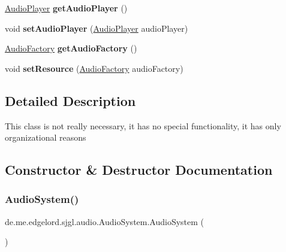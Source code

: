 \begin{DoxyCompactItemize}
\mbox{\hyperlink{classde_1_1me_1_1edgelord_1_1sjgl_1_1audio_1_1_audio_player}{Audio\+Player}} {\bfseries get\+Audio\+Player} ()
\item 
\mbox{\label{classde_1_1me_1_1edgelord_1_1sjgl_1_1audio_1_1_audio_system_ae5cf5555a1535641dbf2f3b8d6ab2d2e}} 
void {\bfseries set\+Audio\+Player} (\mbox{\hyperlink{classde_1_1me_1_1edgelord_1_1sjgl_1_1audio_1_1_audio_player}{Audio\+Player}} audio\+Player)
\item 
\mbox{\label{classde_1_1me_1_1edgelord_1_1sjgl_1_1audio_1_1_audio_system_a732e515c31f6e987cb46ebbd5a029126}} 
\mbox{\hyperlink{classde_1_1me_1_1edgelord_1_1sjgl_1_1factory_1_1_audio_factory}{Audio\+Factory}} {\bfseries get\+Audio\+Factory} ()
\item 
\mbox{\label{classde_1_1me_1_1edgelord_1_1sjgl_1_1audio_1_1_audio_system_aeb5a4e6f6beb91c1a08442f22ce814b0}} 
void {\bfseries set\+Resource} (\mbox{\hyperlink{classde_1_1me_1_1edgelord_1_1sjgl_1_1factory_1_1_audio_factory}{Audio\+Factory}} audio\+Factory)
\end{DoxyCompactItemize}


\subsection{Detailed Description}
This class is not really necessary, it has no special functionality, it has only organizational reasons 

\subsection{Constructor \& Destructor Documentation}
\mbox{\label{classde_1_1me_1_1edgelord_1_1sjgl_1_1audio_1_1_audio_system_a32ecdc18393cafddf6195195ac1be202}} 
\subsubsection{\texorpdfstring{Audio\+System()}{AudioSystem()}\hspace{0.1cm}{\footnotesize\ttfamily [1/2]}}
{\footnotesize\ttfamily de.\+me.\+edgelord.\+sjgl.\+audio.\+Audio\+System.\+Audio\+System (\begin{DoxyParamCaption}{ }\end{DoxyParamCaption})}

